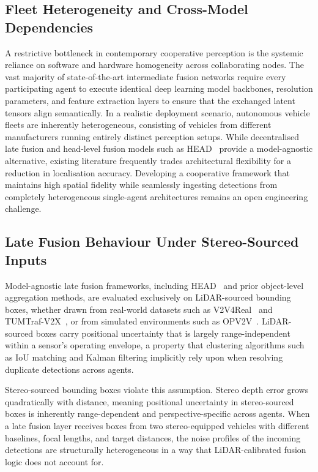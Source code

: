 \subsection{Fleet Heterogeneity and Cross-Model Dependencies}

A restrictive bottleneck in contemporary cooperative perception is the systemic
reliance on software and hardware homogeneity across collaborating nodes. The vast
majority of state-of-the-art intermediate fusion networks require every
participating agent to execute identical deep learning model backbones, resolution
parameters, and feature extraction layers to ensure that the exchanged latent
tensors align semantically. In a realistic deployment scenario, autonomous vehicle
fleets are inherently heterogeneous, consisting of vehicles from different
manufacturers running entirely distinct perception setups. While decentralised
late fusion and head-level fusion models such as HEAD~\cite{qu2024} provide a
model-agnostic alternative, existing literature frequently trades architectural
flexibility for a reduction in localisation accuracy. Developing a cooperative
framework that maintains high spatial fidelity while seamlessly ingesting
detections from completely heterogeneous single-agent architectures remains an
open engineering challenge.

\subsection{Late Fusion Behaviour Under Stereo-Sourced Inputs}

Model-agnostic late fusion frameworks, including HEAD~\cite{qu2024} and prior
object-level aggregation methods, are evaluated exclusively on LiDAR-sourced
bounding boxes, whether drawn from real-world datasets such as
V2V4Real~\cite{xu2023v2v4real} and TUMTraf-V2X~\cite{zimmer2024}, or from
simulated environments such as OPV2V~\cite{xu2022opv2v}. LiDAR-sourced boxes carry
positional uncertainty that is largely range-independent within a sensor's
operating envelope, a property that clustering algorithms such as IoU matching and
Kalman filtering implicitly rely upon when resolving duplicate detections across
agents.

Stereo-sourced bounding boxes violate this assumption. Stereo depth error grows
quadratically with distance, meaning positional uncertainty in stereo-sourced
boxes is inherently range-dependent and perspective-specific across agents. When a
late fusion layer receives boxes from two stereo-equipped vehicles with different
baselines, focal lengths, and target distances, the noise profiles of the incoming
detections are structurally heterogeneous in a way that LiDAR-calibrated fusion
logic does not account for.

